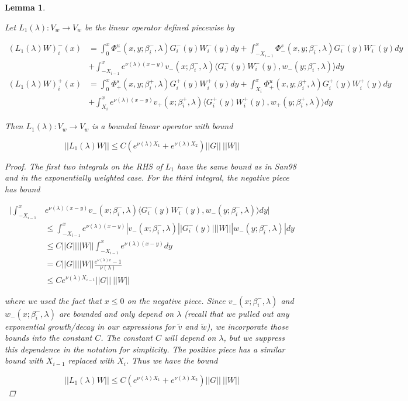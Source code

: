 \documentclass[12pt]{article}
\newtheorem{lemma}{Lemma}
\begin{document}
\begin{lemma}\label{L1}

Let $L_1(\lambda): V_w \rightarrow V_w$ be the linear operator defined piecewise by

\begin{align*}
(L_1(\lambda)W)_i^-(x) &= \int_0^x \Phi^u_-(x, y; \beta_i^-, \lambda) G_i^-(y)W_i^-(y) dy + \int_{-X_{i-1}}^x \Phi^s_-(x, y; \beta_i^-, \lambda) G_i^-(y)W_i^-(y) dy \\
&+ \int_{-X_{i-1}}^x 
e^{\nu(\lambda)(x-y)} v_-(x; \beta_i^-, \lambda) \langle G_i^-(y)W_i^-(y), w_-(y; \beta_i^-, \lambda) \rangle dy \\
(L_1(\lambda)W)_i^+(x) &= \int_0^x \Phi^s_+(x, y; \beta_i^+, \lambda) G_i^+(y) W_i^+(y) dy + \int_{X_i}^x \Phi^u_+(x, y; \beta_i^+, \lambda) G_i^+(y) W_i^+(y) dy \\
&+ \int_{X_i}^x e^{\nu(\lambda)(x-y)} v_+(x; \beta_i^+, \lambda) \langle G_i^+(y)W_i^+(y), w_+(y; \beta_i^+, \lambda) \rangle dy
\end{align*}

Then $L_1(\lambda): V_w \rightarrow V_w$ is a bounded linear operator with bound

\begin{equation}\label{L1bound}
||L_1(\lambda)W|| \leq C (e^{\nu(\lambda)X_1} + e^{\nu(\lambda)X_2}) ||G|| \: ||W||
\end{equation}

\begin{proof}
The first two integrals on the RHS of $L_1$ have the same bound as in San98 and in the exponentially weighted case. For the third integral, the negative piece has bound

\begin{align*}
\Big| \int_{-X_{i-1}}^x &e^{\nu(\lambda)(x-y)} v_-(x; \beta_i^-, \lambda) \langle G_i^-(y)W_i^-(y), w_-(y; \beta_i^-, \lambda) \rangle dy \Big| \\
&\leq \int_{-X_{i-1}}^x e^{\nu(\lambda)(x-y)} |v_-(x; \beta_i^-, \lambda)| |G_i^-(y)|||W|||w_-(y; \beta_i^-, \lambda)|dy \\
&\leq C ||G||||W|| \int_{-X_{i-1}}^x e^{\nu(\lambda)(x-y)} dy \\
&= C ||G||||W|| \frac{e^{\nu(\lambda)x} - 1}{\nu(\lambda)} \\
&\leq C e^{\nu(\lambda)X_{i-1}} ||G|| \: ||W||
\end{align*}

where we used the fact that $x \leq 0$ on the negative piece. Since $v_-(x; 
\beta_i^-, \lambda)$ and $w_-(x; \beta_i^-, \lambda)$ are bounded and only depend on $\lambda$ (recall that we pulled out any exponential growth/decay in our expressions for $\tilde{v}$ and $\tilde{w}$), we incorporate those bounds into the constant $C$. The constant $C$ will depend on $\lambda$, but we suppress this dependence in the notation for simplicity. The positive piece has a similar bound with $X_{i-1}$ replaced with $X_i$. Thus we have the bound

\[
||L_1(\lambda)W|| \leq C (e^{\nu(\lambda)X_1} + e^{\nu(\lambda)X_2}) ||G|| \: ||W||
\]

\end{proof}
\end{lemma}
\end{document}
